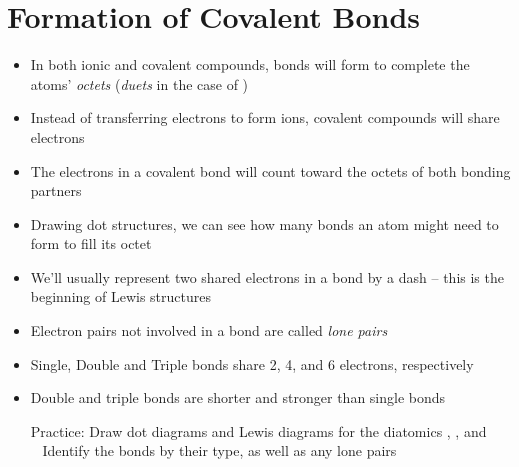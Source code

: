 \documentclass[12pt, openany, letterpaper]{memoir}
\begin{document}
\section{Formation of Covalent Bonds}
\begin{itemize}
	\item In both ionic and covalent compounds, bonds will form to complete the atoms' \emph{octets} (\emph{duets} in the case of )
	\item Instead of transferring electrons to form ions, covalent compounds will share electrons
	\item The electrons in a covalent bond will count toward the octets of both bonding partners
	\item Drawing dot structures, we can see how many bonds an atom might need to form to fill its octet
	\item We'll usually represent two shared electrons in a bond by a dash -- this is the beginning of Lewis structures
	\item Electron pairs not involved in a bond are called \emph{lone pairs}
	\item Single, Double and Triple bonds share 2, 4, and 6 electrons, respectively
	\item Double and triple bonds are shorter and stronger than single bonds
	
	Practice: Draw dot diagrams and Lewis diagrams for the diatomics , , and \\
	~\hphantom{Practice: } Identify the bonds by their type, as well as any lone pairs
\end{itemize}
\end{document}
